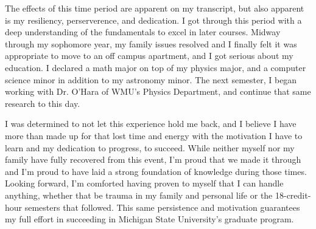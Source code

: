 \documentclass[11pt]{article}
\newcommand{\school}{Michigan State University}
\begin{document}
The effects of this time period are apparent on my transcript, but also apparent is my resiliency, perserverence, and dedication. I got through this period with a deep understanding of the fundamentals to excel in later courses. Midway through my sophomore year, my family issues resolved and I finally felt it was appropriate to move to an off campus apartment, and I got serious about my education. I declared a math major on top of my physics major, and a computer science minor in addition to my astronomy minor. The next semester, I began working with Dr. O'Hara of WMU's Physics Department, and continue that same research to this day.

I was determined to not let this experience hold me back, and I believe I have more than made up for that lost time and energy with the motivation I have to learn and my dedication to progress, to succeed. While neither myself nor my family have fully recovered from this event, I'm proud that we made it through and I'm proud to have laid a strong foundation of knowledge during those times. Looking forward, I'm comforted having proven to myself that I can handle anything, whether that be trauma in my family and personal life or the 18-credit-hour semesters that followed. This same persistence and motivation guarantees my full effort in succeeding in \school{}'s graduate program.
\end{document}
